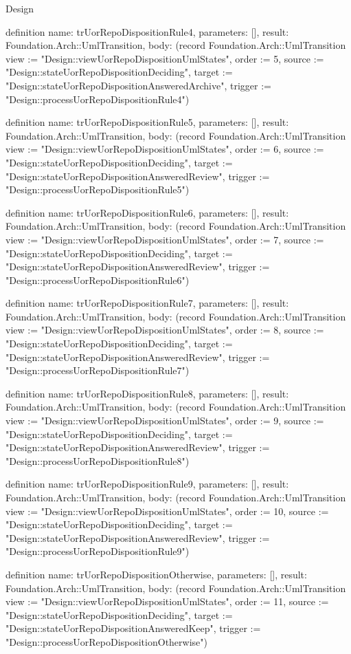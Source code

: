 \begin{lexlean}{Design}
\begin{semanticmodule}
definition{
  name: trUorRepoDispositionRule4,
  parameters: [],
  result: Foundation.Arch::UmlTransition,
  body: (record Foundation.Arch::UmlTransition {view := "Design::viewUorRepoDispositionUmlStates", order := 5, source := "Design::stateUorRepoDispositionDeciding", target := "Design::stateUorRepoDispositionAnsweredArchive", trigger := "Design::processUorRepoDispositionRule4"})
}

definition{
  name: trUorRepoDispositionRule5,
  parameters: [],
  result: Foundation.Arch::UmlTransition,
  body: (record Foundation.Arch::UmlTransition {view := "Design::viewUorRepoDispositionUmlStates", order := 6, source := "Design::stateUorRepoDispositionDeciding", target := "Design::stateUorRepoDispositionAnsweredReview", trigger := "Design::processUorRepoDispositionRule5"})
}

definition{
  name: trUorRepoDispositionRule6,
  parameters: [],
  result: Foundation.Arch::UmlTransition,
  body: (record Foundation.Arch::UmlTransition {view := "Design::viewUorRepoDispositionUmlStates", order := 7, source := "Design::stateUorRepoDispositionDeciding", target := "Design::stateUorRepoDispositionAnsweredReview", trigger := "Design::processUorRepoDispositionRule6"})
}

definition{
  name: trUorRepoDispositionRule7,
  parameters: [],
  result: Foundation.Arch::UmlTransition,
  body: (record Foundation.Arch::UmlTransition {view := "Design::viewUorRepoDispositionUmlStates", order := 8, source := "Design::stateUorRepoDispositionDeciding", target := "Design::stateUorRepoDispositionAnsweredReview", trigger := "Design::processUorRepoDispositionRule7"})
}

definition{
  name: trUorRepoDispositionRule8,
  parameters: [],
  result: Foundation.Arch::UmlTransition,
  body: (record Foundation.Arch::UmlTransition {view := "Design::viewUorRepoDispositionUmlStates", order := 9, source := "Design::stateUorRepoDispositionDeciding", target := "Design::stateUorRepoDispositionAnsweredReview", trigger := "Design::processUorRepoDispositionRule8"})
}

definition{
  name: trUorRepoDispositionRule9,
  parameters: [],
  result: Foundation.Arch::UmlTransition,
  body: (record Foundation.Arch::UmlTransition {view := "Design::viewUorRepoDispositionUmlStates", order := 10, source := "Design::stateUorRepoDispositionDeciding", target := "Design::stateUorRepoDispositionAnsweredReview", trigger := "Design::processUorRepoDispositionRule9"})
}

definition{
  name: trUorRepoDispositionOtherwise,
  parameters: [],
  result: Foundation.Arch::UmlTransition,
  body: (record Foundation.Arch::UmlTransition {view := "Design::viewUorRepoDispositionUmlStates", order := 11, source := "Design::stateUorRepoDispositionDeciding", target := "Design::stateUorRepoDispositionAnsweredKeep", trigger := "Design::processUorRepoDispositionOtherwise"})
}


\end{semanticmodule}
\end{lexlean}
